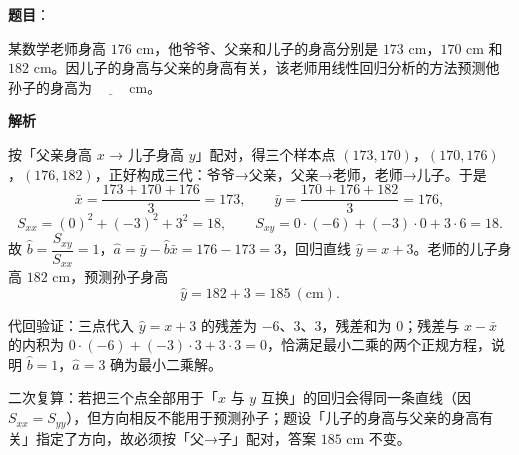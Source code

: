 \begin{answer}

\textbf{题目}：

某数学老师身高 $176$ cm，他爷爷、父亲和儿子的身高分别是 $173$ cm，$170$ cm 和 $182$ cm。因儿子的身高与父亲的身高有关，该老师用线性回归分析的方法预测他孙子的身高为 $\underline{\qquad}$ cm。

\textbf{解析}

按「父亲身高 $x$ → 儿子身高 $y$」配对，得三个样本点 $(173,170)$，$(170,176)$，$(176,182)$，正好构成三代：爷爷→父亲，父亲→老师，老师→儿子。于是
\nopagebreak[4]
\[\bar x=\frac{173+170+176}{3}=173,\qquad \bar y=\frac{170+176+182}{3}=176,\]
\nopagebreak[4]
\[S_{xx}=(0)^2+(-3)^2+3^2=18,\qquad S_{xy}=0\cdot(-6)+(-3)\cdot0+3\cdot6=18.\]
故 $\hat b=\dfrac{S_{xy}}{S_{xx}}=1$，$\hat a=\bar y-\hat b\bar x=176-173=3$，回归直线 $\hat y=x+3$。老师的儿子身高 $182$ cm，预测孙子身高
\nopagebreak[4]
\[\hat y=182+3=185\ (\text{cm}).\]

代回验证：三点代入 $\hat y=x+3$ 的残差为 $-6$、$3$、$3$，残差和为 $0$；残差与 $x-\bar x$ 的内积为 $0\cdot(-6)+(-3)\cdot3+3\cdot3=0$，恰满足最小二乘的两个正规方程，说明 $\hat b=1$，$\hat a=3$ 确为最小二乘解。

二次复算：若把三个点全部用于「$x$ 与 $y$ 互换」的回归会得同一条直线（因 $S_{xx}=S_{yy}$），但方向相反不能用于预测孙子；题设「儿子的身高与父亲的身高有关」指定了方向，故必须按「父→子」配对，答案 $185$ cm 不变。


\end{answer}
